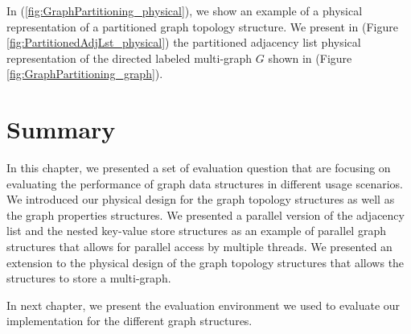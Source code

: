 {In (\ref{fig:GraphPartitioning_physical}), we show an example of a physical representation of a partitioned graph topology structure. We present in (Figure \ref{fig:PartitionedAdjLst_physical}) the partitioned adjacency list physical representation of the directed labeled multi-graph $G$ shown in (Figure \ref{fig:GraphPartitioning_graph}).




\section{Summary}
\label{sec:PhyDesign-Summary}

In this chapter, we presented a set of evaluation question that are focusing on evaluating the performance of graph data structures in different usage scenarios. We introduced our physical design for the graph topology structures as well as the graph properties structures. We presented a parallel version of the adjacency list and the nested key-value store structures as an example of parallel graph structures that allows for parallel access by multiple threads. We presented an extension to the physical design of the graph topology structures that allows the structures to store a multi-graph.

In next chapter, we present the evaluation environment we used to evaluate our implementation for the different graph structures.


}